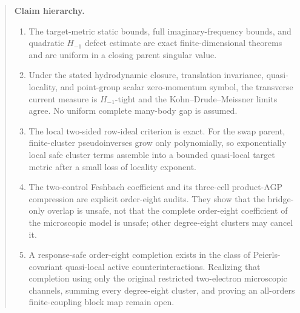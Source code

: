 \documentclass[11pt]{article}
\theoremstyle{definition}
\theoremstyle{remark}
\newcommand{\cZ}{\mathcal Z}
\begin{document}
\begin{abstract}
A local algebraic criterion makes the hypothesis auditable: a cluster term is
state-source safe precisely when it lies in the two-sided parent-row ideal
$r_X=D_X^\dagger X_XD_X$.  We then compute the first connected overlap in the
microscopic Schrieffer--Wolff hierarchy.  Two neighboring bridge controls
produce
\[
 -\frac{\lambda^8\Delta b^4}{2\bar\Delta_m^3}
 \{B_e,B_f\}^2,
\]
and on a three-cell one-pair product-AGP space
$P_{\cZ}\{B_0,B_1\}^2P_{\cZ}=(16/3)\begin{psmallmatrix}1&1\\1&1\end{psmallmatrix}$.
Thus the bridge-only overlap is not response safe; cancellation by the other
degree-eight clusters or an explicit order-eight counterchannel is genuinely
required.  The infinite-volume problem is thereby reduced to a finite
connected-cluster projection and a point-group symbol audit.  We do not claim
that the unmodified microscopic family has already passed that final audit.
\end{abstract}

\begin{quote}\small
\textbf{Claim hierarchy.}
\begin{enumerate}
\item The target-metric static bounds, full imaginary-frequency bounds, and
quadratic $H_{-1}$ defect estimate are exact finite-dimensional theorems and
are uniform in a closing parent singular value.
\item Under the stated hydrodynamic closure, translation invariance,
quasi-locality, and point-group scalar zero-momentum symbol, the transverse
current measure is $H_{-1}$-tight and the Kohn--Drude--Meissner limits agree.
No uniform complete many-body gap is assumed.
\item The local two-sided row-ideal criterion is exact.  For the swap parent,
finite-cluster pseudoinverses grow only polynomially, so exponentially local
safe cluster terms assemble into a bounded quasi-local target metric after a
small loss of locality exponent.
\item The two-control Feshbach coefficient and its three-cell product-AGP
compression are explicit order-eight audits.  They show that the
bridge-only overlap is unsafe, not that the complete order-eight coefficient
of the microscopic model is unsafe; other degree-eight clusters may cancel it.
\item A response-safe order-eight completion exists in the class of
Peierls-covariant quasi-local active counterinteractions.  Realizing that
completion using only the original restricted two-electron microscopic
channels, summing every degree-eight cluster, and proving an all-orders
finite-coupling block map remain open.
\end{enumerate}
\end{quote}
\end{document}
